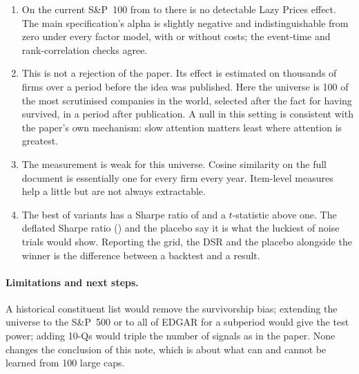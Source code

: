 \documentclass[11pt,a4paper]{article}
\begin{document}
\begin{enumerate}
\item On the current S\&P~100 from \sampleStart{} to \sampleEnd{} there is no detectable Lazy Prices effect. The main specification's alpha is slightly negative and indistinguishable from zero under every factor model, with or without costs; the event-time and rank-correlation checks agree.
\item This is not a rejection of the paper. Its effect is estimated on thousands of firms over a period before the idea was published. Here the universe is 100 of the most scrutinised companies in the world, selected after the fact for having survived, in a period after publication. A null in this setting is consistent with the paper's own mechanism: slow attention matters least where attention is greatest.
\item The measurement is weak for this universe. Cosine similarity on the full document is essentially one for every firm every year. Item-level measures help a little but are not always extractable.
\item The best of \nTrials{} variants has a Sharpe ratio of \bestSharpe{} and a $t$-statistic above one. The deflated Sharpe ratio (\dsrRaw) and the placebo say it is what the luckiest of \nTrials{} noise trials would show. Reporting the grid, the DSR and the placebo alongside the winner is the difference between a backtest and a result.
\end{enumerate}

\paragraph{Limitations and next steps.} A historical constituent list would remove the survivorship bias; extending the universe to the S\&P~500 or to all of EDGAR for a subperiod would give the test power; adding 10-Qs would triple the number of signals as in the paper. None changes the conclusion of this note, which is about what can and cannot be learned from 100 large caps.
\end{document}
